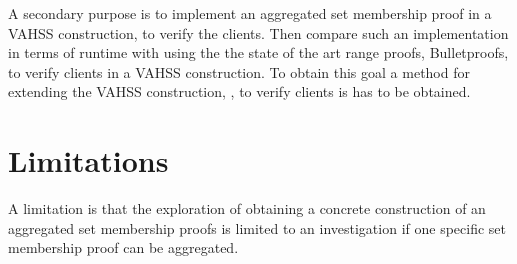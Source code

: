 A secondary purpose is to implement an aggregated set membership proof in a VAHSS construction, to verify the clients. Then compare such an implementation in terms of runtime with using the the state of the art range proofs, Bulletproofs, to verify clients in a VAHSS construction. To obtain this goal a method for extending the VAHSS construction, \cite{SumItUp}, to verify clients is has to be obtained. 


\section*{Limitations}
A limitation is that the exploration of obtaining a concrete construction of an aggregated set membership proofs is limited to an investigation if one specific set membership proof can be aggregated. 




